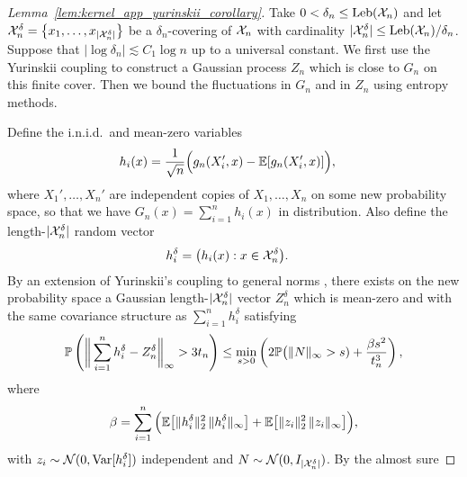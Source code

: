 \begin{proof}[Lemma~\ref{lem:kernel_app_yurinskii_corollary}]

  Take $0 < \delta_n \leq \Leb(\cX_n)$ and let
  $\cX_n^\delta = \big\{ x_1, \dots, x_{|\cX_n^\delta|}\big\}$
  be a $\delta_n$-covering of $\cX_n$ with cardinality
  $|\cX_n^\delta| \leq \Leb(\cX_n)/\delta_n$.
  Suppose that $\left|\log \delta_n\right| \lesssim C_1 \log n$
  up to a universal constant.
  We first use the Yurinskii coupling to
  construct a Gaussian process
  $Z_n$
  which is close to $G_n$
  on this finite cover.
  Then we bound the fluctuations in $G_n$
  and in $Z_n$
  using entropy methods.


  Define the i.n.i.d.\
  and mean-zero variables
  \begin{align*}
    h_i(x)
    &=
    \frac{1}{\sqrt n}
    \Big(
      g_n(X_i', x)
      - \E[g_n(X_i', x)]
    \Big),
  \end{align*}
  where $X_1', \ldots, X_n'$
  are independent copies of $X_1, \ldots, X_n$
  on some new probability space,
  so that we have
  $G_n(x) = \sum_{i=1}^n h_i(x)$
  in distribution.
  Also define the length-$|\cX_n^\delta|$ random vector
  \begin{align*}
    h_i^\delta
    &=
    \big(
      h_i(x): x \in \cX_n^\delta
    \big).
  \end{align*}
  By an extension of
  Yurinskii's coupling
  to general norms
  \citep[supplemental materials, Lemma~38]{belloni2019conditional},
  there exists on the new probability space a
  Gaussian length-$|\cX_n^\delta|$ vector $Z_n^\delta$
  which is mean-zero
  and with the same covariance structure as
  $
  \sum_{i=1}^n
  h_i^\delta
  $
  satisfying
  \begin{align*}
    \P\left(
      \bigg\|
      \sum_{i=1}^n
      h_i^\delta
      - Z_n^\delta
      \bigg\|_\infty
      > 3 t_n
    \right)
    \leq
    \min_{s > 0}
    \left(
      2 \P\big( \|N\|_\infty > s)
      + \frac{\beta s^2}{t_n^3}
    \right),
  \end{align*}
  where
  \begin{align*}
    \beta
    = \sum_{i=1}^n
    \Big(
      \E\big[\|h_i^\delta\|_2^2 \,
        \|h_i^\delta\|_\infty
      \big]
      + \E\big[\|z_i\|_2^2 \,
        \|z_i\|_\infty
      \big]
    \Big),
  \end{align*}
  with
  $z_i \sim \cN(0, \Var[h_i^\delta])$
  independent and
  $N \sim \cN(0, I_{|\cX_n^\delta|})$.
  By the almost sure

\end{proof}
